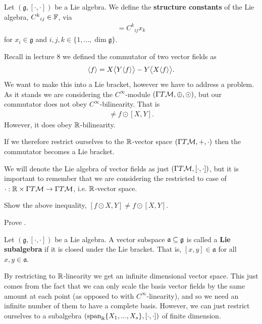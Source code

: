 \documentclass[12pt]{article} %
\begin{document}
    Let $(\mathfrak{g},[\cdot,\cdot])$ be a Lie algebra. We define the \textbf{structure constants} of the Lie algebra, ${C^k}_{ij}\in\mathbb{F}$, via 
    \begin{align*} 
        [x_i,x_j] = {C^k}_{ij}x_k
    \end{align*} 
    for $x_i\in\mathfrak{g}$ and $i,j,k\in\{1,...,\dim\mathfrak{g}\}$.
\ed 

Recall in lecture 8 we defined the commutator of two vector fields as 
\begin{align*} 
    [X,Y]\la f \ra = X\big\la Y\la f\ra \big\ra - Y\big\la X\la f\ra \big\ra. 
\end{align*} 
We want to make this into a Lie bracket, however we have to address a problem. As it stands we are considering the $C^{\infty}$-module $(\Gamma T\mathcal{M},\oplus,\odot)$, but our commutator does not obey $C^{\infty}$-bilinearity. That is 
\begin{align*} 
    [f\odot X,Y] \neq f\odot [X,Y].
\end{align*} 
However, it does obey $\mathbb{R}$-bilinearity. 

\bp 
\label{prop:LieAlgebraVectorFields}
    If we therefore restrict ourselves to the $\mathbb{R}$-vector space $(\Gamma T\mathcal{M},+,\cdot)$ then the commutator becomes a Lie bracket. 
\ep 

\bnn 
    We will denote the Lie algebra of vector fields as just $(\Gamma T\mathcal{M},[\cdot,\cdot])$, but it is important to remember that we are considering the restricted to case of $\cdot:\mathbb{R}\times\Gamma T\mathcal{M} \to \Gamma T\mathcal{M}$, i.e. $\mathbb{R}$-vector space.
\enn 

\bbox 
    \ben[label=(\alph*)]
    \item Show the above inequality, $[f\odot X,Y] \neq f\odot [X,Y]$.
    \item Prove .
    \een 
\ebox 

    Let $(\mathfrak{g}, [\cdot,\cdot])$ be a Lie algebra. A vector subspace $\mathfrak{a}\subseteq\mathfrak{g}$ is called a \textbf{Lie subalgebra} if it is closed under the Lie bracket. That is, $[x,y]\in\mathfrak{a}$ for all $x,y\in\mathfrak{a}$. 
\ed 

By restricting to $\mathbb{R}$-linearity we get an infinite dimensional vector space. This just comes from the fact that we can only scale the basis vector fields by the same amount at each point (as opposed to with $C^{\infty}$-linearity), and so we need an infinite number of them to have a complete basis. However, we can just restrict ourselves to a subalgebra $(\text{span}_{\mathbb{R}}\{X_1,...,X_s\},[\cdot,\cdot])$ of finite dimension. 
\end{document}
